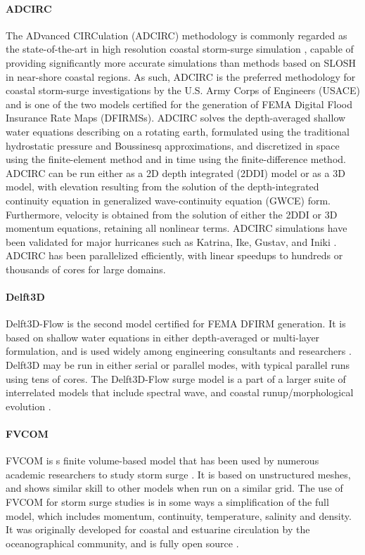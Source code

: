 \paragraph{ADCIRC} The ADvanced CIRCulation (ADCIRC) methodology is commonly regarded as the state-of-the-art in high resolution coastal storm-surge simulation \citep{luettich1992adcirc}, capable of providing significantly more accurate simulations than methods based on SLOSH \citep{resio2008modeling} in near-shore coastal regions. As such, ADCIRC is the preferred methodology for coastal storm-surge investigations by the U.S. Army Corps of Engineers (USACE) and is one of the two models certified for the generation of FEMA Digital Flood Insurance Rate Maps (DFIRMSs). ADCIRC solves the depth-averaged shallow water equations describing on a rotating earth, formulated using the traditional hydrostatic pressure and Boussinesq approximations, and discretized in space using the finite-element method and in time using the finite-difference method. ADCIRC can be run either as a 2D depth integrated (2DDI) model or as a 3D model, with elevation resulting from the solution of the depth-integrated continuity equation in generalized wave-continuity equation (GWCE) form. Furthermore, velocity is obtained from the solution of either the 2DDI or 3D momentum equations, retaining all nonlinear terms. ADCIRC simulations have been validated for major hurricanes such as Katrina, Ike, Gustav, and Iniki \citep{kennedy2011origin,kennedy2012tropical}. ADCIRC has been parallelized efficiently, with linear speedups to hundreds or thousands of cores for large domains. 

\paragraph{Delft3D} Delft3D-Flow is the second model certified for FEMA DFIRM generation. It is based on shallow water equations in either depth-averaged or multi-layer formulation, and is used widely among engineering consultants and researchers \citep{hu2015numerical,vousdoukas2016projections}. Delft3D may be run in either serial or parallel modes, with typical parallel runs using tens of cores. The Delft3D-Flow surge model is a part of a larger suite of interrelated models that include spectral wave, and coastal runup/morphological evolution \cite{deltaressystems2011delft3d}. 

\paragraph{FVCOM} FVCOM is s finite volume-based model that has been used by numerous academic researchers to study storm surge \citep{kerr2013ioos,rego2010storm}. It is based on unstructured meshes, and shows similar skill to other models when run on a similar grid. The use of FVCOM for storm surge studies is in some ways a simplification of the full model, which includes momentum, continuity, temperature, salinity and density. It was originally developed for coastal and estuarine circulation by the oceanographical community, and is fully open source \citep{chen2003unstructured}. 

